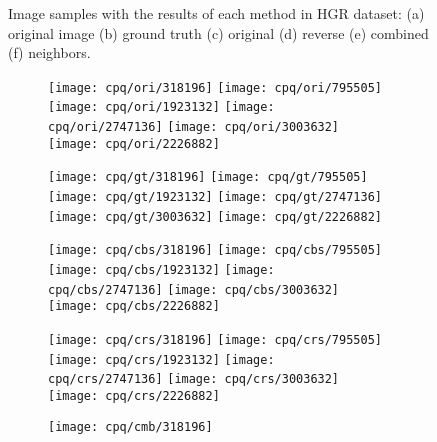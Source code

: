 \begin{figure*}[!htb]
    \caption[Image samples with the results of each method in HGR dataset]{Image samples with the results of each method in HGR dataset: (a) original image (b) ground truth (c) original \cite{brancati:17} (d) reverse (e) combined (f) neighbors.}
    \label{fig:results_hgr}
\end{figure*}

\begin{figure*}[!htb]
    \centering
    \begin{subfigure}[t]{0.15\textwidth}
        \texttt{[image: cpq/ori/318196]}
        \texttt{[image: cpq/ori/795505]}
        \texttt{[image: cpq/ori/1923132]}
        \texttt{[image: cpq/ori/2747136]}
        \texttt{[image: cpq/ori/3003632]}
        \texttt{[image: cpq/ori/2226882]}
        \caption{}
    \end{subfigure}
    \begin{subfigure}[t]{0.15\textwidth}
        \texttt{[image: cpq/gt/318196]}
        \texttt{[image: cpq/gt/795505]}
        \texttt{[image: cpq/gt/1923132]}
        \texttt{[image: cpq/gt/2747136]}
        \texttt{[image: cpq/gt/3003632]}
        \texttt{[image: cpq/gt/2226882]}
        \caption{}
    \end{subfigure}
    \begin{subfigure}[t]{0.15\textwidth}
        \texttt{[image: cpq/cbs/318196]}
        \texttt{[image: cpq/cbs/795505]}
        \texttt{[image: cpq/cbs/1923132]}
        \texttt{[image: cpq/cbs/2747136]}
        \texttt{[image: cpq/cbs/3003632]}
        \texttt{[image: cpq/cbs/2226882]}
        \caption{}
    \end{subfigure}
    \begin{subfigure}[t]{0.15\textwidth}
        \texttt{[image: cpq/crs/318196]}
        \texttt{[image: cpq/crs/795505]}
        \texttt{[image: cpq/crs/1923132]}
        \texttt{[image: cpq/crs/2747136]}
        \texttt{[image: cpq/crs/3003632]}
        \texttt{[image: cpq/crs/2226882]}
        \caption{}
    \end{subfigure}
    \begin{subfigure}[t]{0.15\textwidth}
        \texttt{[image: cpq/cmb/318196]}

\end{subfigure}
\end{figure*}
